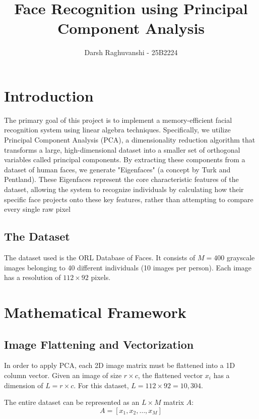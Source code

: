 \documentclass[12pt]{article}
\title{Face Recognition using Principal Component Analysis}
\author{Darsh Raghuvanshi - 25B2224}
\begin{document}
\maketitle

\section{Introduction}
The primary goal of this project is to implement a memory-efficient facial recognition system using linear algebra techniques. Specifically, we utilize Principal Component Analysis (PCA), a dimensionality reduction algorithm that transforms a large, high-dimensional dataset into a smaller set of orthogonal variables called principal components. By extracting these components from a dataset of human faces, we generate "Eigenfaces" (a concept by Turk and Pentland). These Eigenfaces represent the core characteristic features of the dataset, allowing the system to recognize individuals by calculating how their specific face projects onto these key features, rather than attempting to compare every single raw pixel

\subsection{The Dataset}
The dataset used is the ORL Database of Faces. It consists of $M = 400$ grayscale images belonging to 40 different individuals (10 images per person). Each image has a resolution of $112 \times 92$ pixels.

\section{Mathematical Framework}

\subsection{Image Flattening and Vectorization}
In order to apply PCA, each 2D image matrix must be flattened into a 1D column vector. Given an image of size $r \times c$, the flattened vector $x_i$ has a dimension of $L = r \times c$. For this dataset, $L = 112 \times 92 = 10,304$. 

The entire dataset can be represented as an $L \times M$ matrix $A$:
\begin{equation}
    A = [x_1, x_2, \dots, x_M]
\end{equation}
\end{document}
